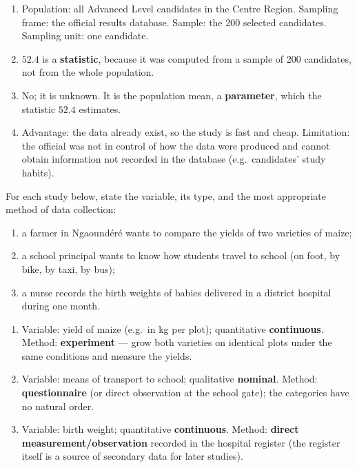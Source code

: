\documentclass[11pt]{article}
\begin{document}
\begin{corrige}[Exercise 1]
\begin{enumerate}
\item Population: all Advanced Level candidates in the Centre Region. Sampling frame: the official results database. Sample: the 200 selected candidates. Sampling unit: one candidate.
\item $52.4$ is a \textbf{statistic}, because it was computed from a sample of 200 candidates, not from the whole population.
\item No; it is unknown. It is the population mean, a \textbf{parameter}, which the statistic $52.4$ estimates.
\item Advantage: the data already exist, so the study is fast and cheap. Limitation: the official was not in control of how the data were produced and cannot obtain information not recorded in the database (e.g.\ candidates' study habits).
\end{enumerate}
\end{corrige}

\begin{exercice}
For each study below, state the variable, its type, and the most appropriate method of data collection:
\begin{enumerate}
\item a farmer in Ngaoundéré wants to compare the yields of two varieties of maize;
\item a school principal wants to know how students travel to school (on foot, by bike, by taxi, by bus);
\item a nurse records the birth weights of babies delivered in a district hospital during one month.
\end{enumerate}
\end{exercice}

\begin{corrige}[Exercise 2]
\begin{enumerate}
\item Variable: yield of maize (e.g.\ in kg per plot); quantitative \textbf{continuous}. Method: \textbf{experiment} — grow both varieties on identical plots under the same conditions and measure the yields.
\item Variable: means of transport to school; qualitative \textbf{nominal}. Method: \textbf{questionnaire} (or direct observation at the school gate); the categories have no natural order.
\item Variable: birth weight; quantitative \textbf{continuous}. Method: \textbf{direct measurement/observation} recorded in the hospital register (the register itself is a source of secondary data for later studies).
\end{enumerate}
\end{corrige}
\end{document}
